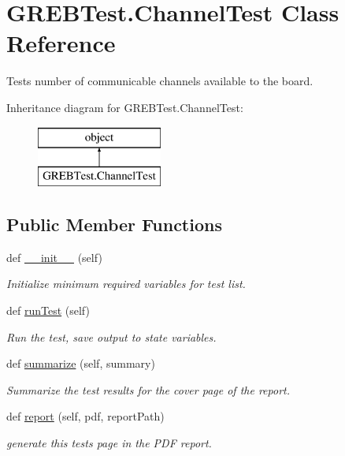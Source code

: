 \hypertarget{class_g_r_e_b_test_1_1_channel_test}{}\section{G\+R\+E\+B\+Test.\+Channel\+Test Class Reference}
\label{class_g_r_e_b_test_1_1_channel_test}


Tests number of communicable channels available to the board.  


Inheritance diagram for G\+R\+E\+B\+Test.\+Channel\+Test\+:\begin{figure}[H]
\begin{center}
\leavevmode
\includegraphics[height=2.000000cm]{class_g_r_e_b_test_1_1_channel_test}
\end{center}
\end{figure}
\subsection*{Public Member Functions}
\begin{DoxyCompactItemize}
\item 
def \hyperlink{class_g_r_e_b_test_1_1_channel_test_aa01ae906573e0a056b12b23acb1e3039}{\+\_\+\+\_\+init\+\_\+\+\_\+} (self)
\begin{DoxyCompactList}\small\item\em Initialize minimum required variables for test list. \end{DoxyCompactList}\item 
def \hyperlink{class_g_r_e_b_test_1_1_channel_test_ad3b83c5d4ba92385d6c9a0b41971cb98}{run\+Test} (self)
\begin{DoxyCompactList}\small\item\em Run the test, save output to state variables. \end{DoxyCompactList}\item 
def \hyperlink{class_g_r_e_b_test_1_1_channel_test_a7256a7c8f9aad2de49575381bebb099b}{summarize} (self, summary)
\begin{DoxyCompactList}\small\item\em Summarize the test results for the cover page of the report. \end{DoxyCompactList}\item 
def \hyperlink{class_g_r_e_b_test_1_1_channel_test_a2741ea419616e82f0f2e845c9f11d66f}{report} (self, pdf, report\+Path)
\begin{DoxyCompactList}\small\item\em generate this test\textquotesingle{}s page in the P\+DF report. \end{DoxyCompactList}\end{DoxyCompactItemize}


